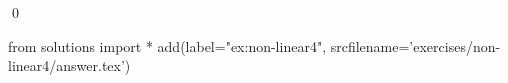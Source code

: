 
\begin{ex} 
  \label{ex:non-linear4}
  
  \qed
\end{ex} 
\begin{python0}
from solutions import *
add(label="ex:non-linear4",
    srcfilename='exercises/non-linear4/answer.tex') 
\end{python0}
